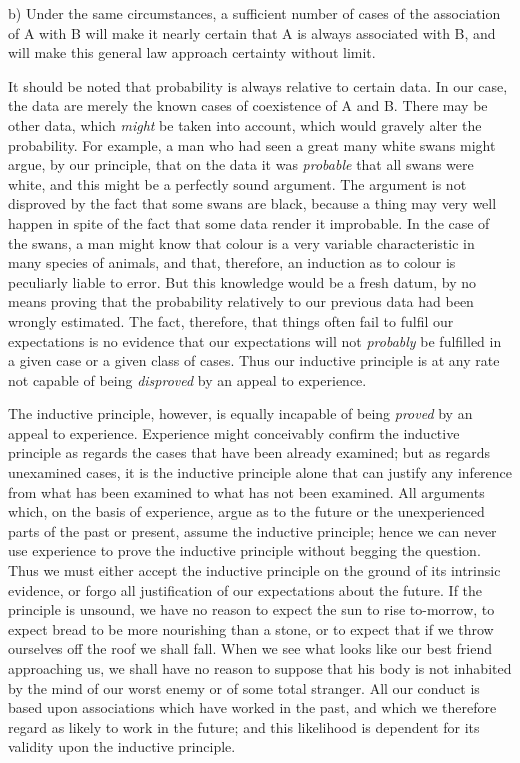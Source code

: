 \documentclass[oneside,letterpaper,12pt]{book}
\begin{document}
b) Under the same circumstances, a sufficient number of cases of the
association of A with B will make it nearly certain that A is always
associated with B, and will make this general law approach certainty
without limit.

It should be noted that probability is always relative to certain data.
In our case, the data are merely the known cases of coexistence of A and
B. There may be other data, which \emph{might} be taken into account,
which would gravely alter the probability. For example, a man who had
seen a great many white swans might argue, by our principle, that on the
data it was \emph{probable} that all swans were white, and this might be
a perfectly sound argument. The argument is not disproved by the fact
that some swans are black, because a thing may very well happen in spite
of the fact that some data render it improbable. In the case of the
swans, a man might know that colour is a very variable characteristic in
many species of animals, and that, therefore, an induction as to colour
is peculiarly liable to error. But this knowledge would be a fresh
datum, by no means proving that the probability relatively to our
previous data had been wrongly estimated. The fact, therefore, that
things often fail to fulfil our expectations is no evidence that our
expectations will not \emph{probably} be fulfilled in a given case or a
given class of cases. Thus our inductive principle is at any rate not
capable of being \emph{disproved} by an appeal to experience.

The inductive principle, however, is equally incapable of being
\emph{proved} by an appeal to experience. Experience might conceivably
confirm the inductive principle as regards the cases that have been
already examined; but as regards unexamined cases, it is the inductive
principle alone that can justify any inference from what has been
examined to what has not been examined. All arguments which, on the
basis of experience, argue as to the future or the unexperienced parts
of the past or present, assume the inductive principle; hence we can
never use experience to prove the inductive principle without begging
the question. Thus we must either accept the inductive principle on the
ground of its intrinsic evidence, or forgo all justification of our
expectations about the future. If the principle is unsound, we have no
reason to expect the sun to rise to-morrow, to expect bread to be more
nourishing than a stone, or to expect that if we throw ourselves off the
roof we shall fall. When we see what looks like our best friend
approaching us, we shall have no reason to suppose that his body is not
inhabited by the mind of our worst enemy or of some total stranger. All
our conduct is based upon associations which have worked in the past,
and which we therefore regard as likely to work in the future; and this
likelihood is dependent for its validity upon the inductive principle.
\end{document}
